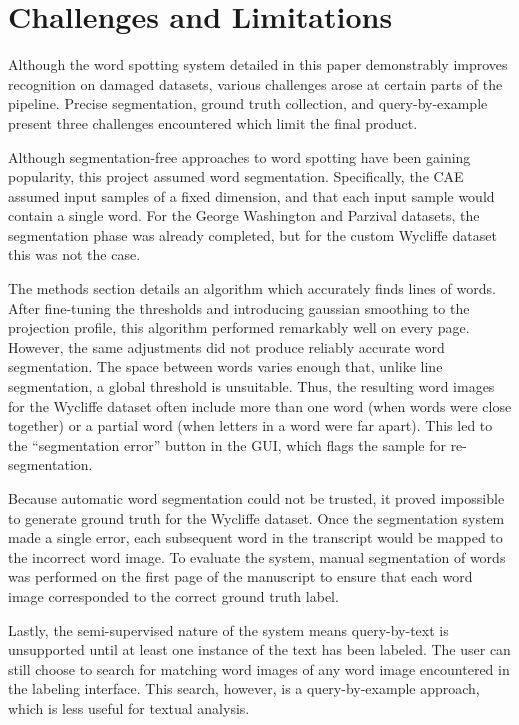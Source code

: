 \documentclass[final]{ukthesis}
\begin{document}
\section{Challenges and Limitations}
\label{sec:challenges}
Although the word spotting system detailed in this paper demonstrably improves recognition on damaged datasets, various challenges arose at certain parts of the pipeline. Precise segmentation, ground truth collection, and query-by-example present three challenges encountered which limit the final product.

Although segmentation-free approaches to word spotting have been gaining popularity, this project assumed word segmentation. Specifically, the CAE assumed input samples of a fixed dimension, and that each input sample would contain a single word. For the George Washington and Parzival datasets, the segmentation phase was already completed, but for the custom Wycliffe dataset this was not the case.

The methods section details an algorithm which accurately finds lines of words. After fine-tuning the thresholds and introducing gaussian smoothing to the projection profile, this algorithm performed remarkably well on every page. However, the same adjustments did not produce reliably accurate word segmentation. The space between words varies enough that, unlike line segmentation, a global threshold is unsuitable. Thus, the resulting word images for the Wycliffe dataset often include more than one word (when words were close together) or a partial word (when letters in a word were far apart). This led to the ``segmentation error'' button in the GUI, which flags the sample for re-segmentation.

Because automatic word segmentation could not be trusted, it proved impossible to generate ground truth for the Wycliffe dataset. Once the segmentation system made a single error, each subsequent word in the transcript would be mapped to the incorrect word image. To evaluate the system, manual segmentation of words was performed on the first page of the manuscript to ensure that each word image corresponded to the correct ground truth label.

Lastly, the semi-supervised nature of the system means query-by-text is unsupported until at least one instance of the text has been labeled. The user can still choose to search for matching word images of any word image encountered in the labeling interface. This search, however, is a query-by-example approach, which is less useful for textual analysis.
\end{document}
